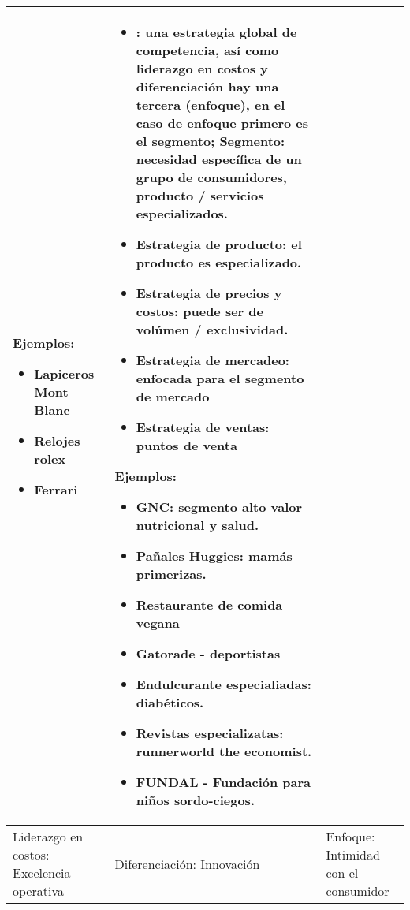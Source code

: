 \begin{itemize}
\begin{center}
\begin{supertabular}{ | p{6cm} | p{6cm} | p{6cm} |}
\begin{itemize}
                \end{itemize} 
                Ejemplos: 
                    \begin{itemize}
                        \item Lapiceros Mont Blanc 
                        \item Relojes rolex 
                        \item Ferrari 
                    \end{itemize}
                & 
                \begin{itemize}
                    \item {}: una estrategia global de competencia, así como liderazgo en costos y diferenciación hay una tercera (enfoque), en el caso de enfoque primero es el segmento; Segmento: necesidad específica de un grupo de consumidores, producto / servicios especializados.
                    \item Estrategia de producto: el producto es especializado.
                    \item Estrategia de precios y costos: puede ser de volúmen / exclusividad.
                    \item Estrategia de mercadeo: enfocada para el segmento de mercado
                    \item Estrategia de ventas: puntos de venta
                \end{itemize}
                Ejemplos: 
                    \begin{itemize}
                        \item GNC: segmento alto valor nutricional y salud.
                        \item Pañales Huggies: mamás primerizas.
                        \item Restaurante de comida vegana 
                        \item Gatorade - deportistas  
                        \item Endulcurante especialiadas: diabéticos. 
                        \item Revistas especializatas: runnerworld the economist.
                        \item FUNDAL - Fundación para niños sordo-ciegos.
                    \end{itemize}
                \\ 
               \hline
               Liderazgo en costos: Excelencia operativa & Diferenciación: Innovación & Enfoque: Intimidad con el consumidor \\ 

\end{supertabular}
\end{center}
\end{itemize}
